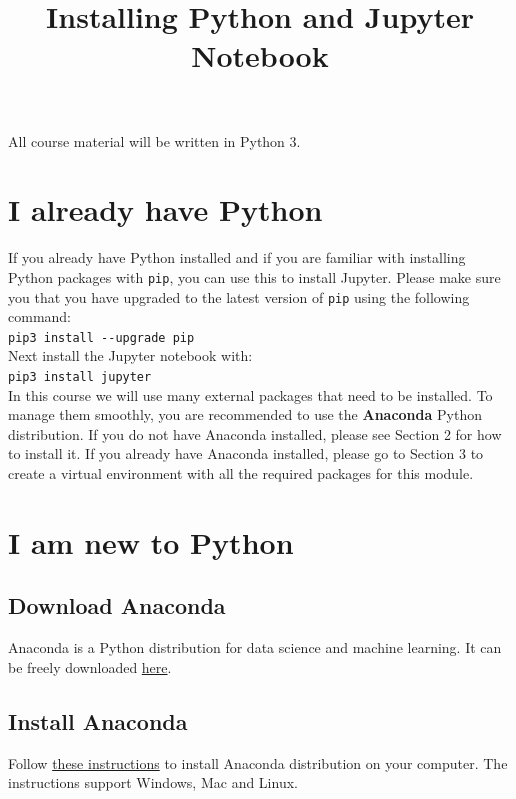 \documentclass[12pt]{article}
\title{Installing Python and Jupyter Notebook}
\date{}
\begin{document}
\maketitle

\noindent All course material will be written in Python 3.

\section{I already have Python}
If you already have Python installed and if you are familiar with installing
Python packages with \verb|pip|, you can use this to install Jupyter. Please make
sure you that you have upgraded to the latest version of \verb|pip| using the following command: \\

\verb|pip3 install --upgrade pip| \\

\noindent Next install the Jupyter notebook with: \\

\verb|pip3 install jupyter| \\

\noindent In this course we will use many external packages that need to be installed. To manage them smoothly, you are recommended to use the \textbf{Anaconda} Python distribution. If you
do not have Anaconda installed, please see Section 2 for how to install it.
If you already have Anaconda installed, please go to Section 3 to create a
virtual environment with all the required packages for this module.

\section{I am new to Python}
    \subsection{Download Anaconda}
    Anaconda is a Python distribution for data science and machine learning.
    It can be freely downloaded \href{https://www.anaconda.com/products/individual-d}{here}.
    
    \subsection{Install Anaconda}
    Follow \href{https://docs.anaconda.com/anaconda/install/}{these instructions} to install Anaconda distribution on your computer. The instructions support Windows, Mac and Linux.
    
\end{document}
